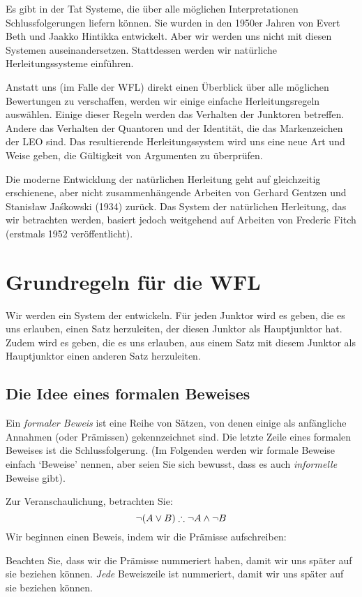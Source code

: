 Es gibt in der Tat Systeme, die über alle möglichen Interpretationen Schlussfolgerungen liefern können. Sie wurden in den 1950er Jahren von Evert Beth und Jaakko Hintikka entwickelt. Aber wir werden uns nicht mit diesen Systemen auseinandersetzen. Stattdessen werden wir natürliche Herleitungssysteme einführen. 

Anstatt uns (im Falle der WFL) direkt einen Überblick über alle möglichen Bewertungen zu verschaffen, werden wir einige einfache Herleitungsregeln auswählen. Einige dieser Regeln werden das Verhalten der Junktoren betreffen. Andere das Verhalten der Quantoren und der Identität, die das Markenzeichen der LEO sind. Das resultierende Herleitungssystem wird uns eine neue Art und Weise geben, die Gültigkeit von Argumenten zu überprüfen. 

Die moderne Entwicklung der natürlichen Herleitung geht auf gleichzeitig erschienene, aber nicht zusammenhängende Arbeiten von Gerhard Gentzen und Stanis\l{}aw Ja\'{s}kowski (1934) zurück. Das System der natürlichen Herleitung, das wir betrachten werden, basiert jedoch weitgehend auf Arbeiten von Frederic Fitch (erstmals 1952 veröffentlicht). 

\chapter{Grundregeln für die WFL}\label{s:BasicTFL}
Wir werden ein System der  entwickeln. Für jeden Junktor wird es  geben, die es uns erlauben, einen Satz herzuleiten, der diesen Junktor als Hauptjunktor hat. Zudem wird es  geben, die es uns erlauben, aus einem Satz mit diesem Junktor als Hauptjunktor einen anderen Satz herzuleiten.

\section{Die Idee eines formalen Beweises}
Ein \emph{formaler Beweis} ist eine Reihe von Sätzen, von denen einige als anfängliche Annahmen (oder Prämissen) gekennzeichnet sind. Die letzte Zeile eines formalen Beweises ist die Schlussfolgerung. (Im Folgenden werden wir formale Beweise einfach `Beweise' nennen, aber seien Sie sich bewusst, dass es auch \emph{informelle} Beweise gibt).

Zur Veranschaulichung, betrachten Sie:
	$$\enot (A \eor B) \therefore \enot A \eand \enot B$$
Wir beginnen einen Beweis, indem wir die Prämisse aufschreiben:
\begin{fitchproof}
\end{fitchproof}
Beachten Sie, dass wir die Prämisse nummeriert haben, damit wir uns später auf sie beziehen können. \emph{Jede} Beweiszeile ist nummeriert, damit wir uns später auf sie beziehen können. 

